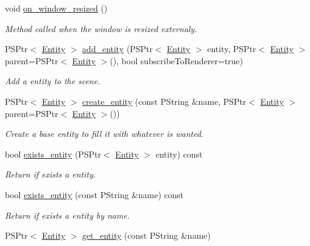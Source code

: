 \begin{DoxyCompactItemize}
void \mbox{\hyperlink{classprz_1_1_scene_a236daf32a516ceb45c5a2ad2fa271b84}{on\+\_\+window\+\_\+resized}} ()
\begin{DoxyCompactList}\small\item\em Method called when the window is resized externaly. \end{DoxyCompactList}\item 
P\+S\+Ptr$<$ \mbox{\hyperlink{classprz_1_1_entity}{Entity}} $>$ \mbox{\hyperlink{classprz_1_1_scene_a6b2893cd5382fe548f79278ccaaa7919}{add\+\_\+entity}} (P\+S\+Ptr$<$ \mbox{\hyperlink{classprz_1_1_entity}{Entity}} $>$ entity, P\+S\+Ptr$<$ \mbox{\hyperlink{classprz_1_1_entity}{Entity}} $>$ parent=P\+S\+Ptr$<$ \mbox{\hyperlink{classprz_1_1_entity}{Entity}} $>$(), bool subscribe\+To\+Renderer=true)
\begin{DoxyCompactList}\small\item\em Add a entity to the scene. \end{DoxyCompactList}\item 
P\+S\+Ptr$<$ \mbox{\hyperlink{classprz_1_1_entity}{Entity}} $>$ \mbox{\hyperlink{classprz_1_1_scene_a4556c6d177223750d558227109b230cd}{create\+\_\+entity}} (const P\+String \&name, P\+S\+Ptr$<$ \mbox{\hyperlink{classprz_1_1_entity}{Entity}} $>$ parent=P\+S\+Ptr$<$ \mbox{\hyperlink{classprz_1_1_entity}{Entity}} $>$())
\begin{DoxyCompactList}\small\item\em Create a base entity to fill it with whatever is wanted. \end{DoxyCompactList}\item 
bool \mbox{\hyperlink{classprz_1_1_scene_aa3c59d6b9df4fb911fce48003a6f945b}{exists\+\_\+entity}} (P\+S\+Ptr$<$ \mbox{\hyperlink{classprz_1_1_entity}{Entity}} $>$ entity) const
\begin{DoxyCompactList}\small\item\em Return if exists a entity. \end{DoxyCompactList}\item 
bool \mbox{\hyperlink{classprz_1_1_scene_abd37a8193847977ecf5f6352aaa77042}{exists\+\_\+entity}} (const P\+String \&name) const
\begin{DoxyCompactList}\small\item\em Return if exists a entity by name. \end{DoxyCompactList}\item 
P\+S\+Ptr$<$ \mbox{\hyperlink{classprz_1_1_entity}{Entity}} $>$ \mbox{\hyperlink{classprz_1_1_scene_aba275583269ef775fd5d75777a5b33fb}{get\+\_\+entity}} (const P\+String \&name)

\end{DoxyCompactItemize}
